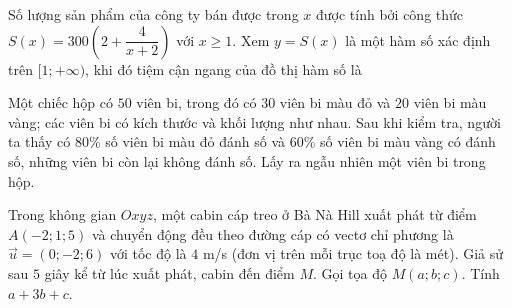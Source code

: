 \caukq
\begin{ex} %
	Số lượng sản phẩm của công ty bán được trong $x$ được tính bởi công thức $S(x)=300\left(2+\dfrac{4}{x+2}\right)$ với $x\ge 1$. Xem $y=S(x)$ là một hàm số xác định trên $[1;+\infty)$, khi đó tiệm cận ngang của đồ thị hàm số là
\end{ex}

\cautl
\begin{ex} %
	Một chiếc hộp có $50$ viên bi, trong đó có $30$ viên bi màu đỏ và $20$ viên bi màu vàng; các viên bi có kích thước và khối lượng như nhau. Sau khi kiểm tra, người ta thấy có $80$\% số viên bi màu đỏ đánh số và $60$\% số viên bi màu vàng có đánh số, những viên bi còn lại không đánh số. Lấy ra ngẫu nhiên một viên bi trong hộp.
	\loigiai{
	
}
\end{ex}

\begin{ex} %
	Trong không gian $Oxyz$, một cabin cáp treo ở Bà Nà Hill xuất phát từ điểm $A(-2;1;5)$ và chuyển động đều theo đường cáp có vectơ chỉ phương là $\overrightarrow{u}=(0;-2;6)$ với tốc độ là $4$ m/s (đơn vị trên mỗi trục toạ độ là mét). Giả sử sau $5$ giây kể từ lúc xuất phát, cabin đến điểm $M$. Gọi tọa độ $M(a;b;c)$. Tính $a+3b+c$.
\end{ex}

